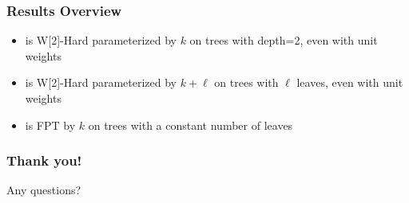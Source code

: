 \begin{frame}[t]
    \frametitle{Results Overview}
    \begin{itemize}
        \item \gm is W[2]-Hard parameterized by $k$ on trees with depth=2, even with unit weights
        \item \gm is W[2]-Hard parameterized by $k+\ell$ on trees with $\ell$ leaves, even with unit weights
        \item \gm is FPT by $k$ on trees with a constant number of leaves
    \end{itemize}
    \vspace{1.0cm}
\end{frame}

\begin{frame}[t]
    \frametitle{Thank you!}
    Any questions?
\end{frame}